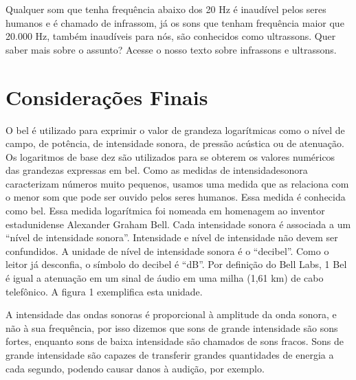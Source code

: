 \documentclass[
	article,		
	11pt,			
	oneside,		
	a4paper,			
	english,			
	brazil			
]{abntex2}
\begin{document}
Qualquer som que tenha frequência abaixo dos 20 Hz é inaudível pelos seres humanos e é chamado de infrassom, já os sons que tenham frequência maior que 20.000 Hz, também inaudíveis para nós, são conhecidos como ultrassons. Quer saber mais sobre o assunto? Acesse o nosso texto sobre infrassons e ultrassons.

\section{Considerações Finais}

O bel é utilizado para exprimir o valor de grandeza logarítmicas como o nível de campo, de potência, de intensidade sonora, de pressão acústica ou de atenuação. Os logaritmos de base dez são utilizados para se obterem os valores numéricos das grandezas expressas em bel. Como as medidas de intensidadesonora caracterizam números muito pequenos, usamos uma medida que as relaciona com o menor som que pode ser ouvido pelos seres humanos. Essa medida é conhecida como bel. Essa medida logarítmica foi nomeada em homenagem ao inventor estadunidense Alexander Graham Bell.
Cada intensidade sonora é associada a um “nível de intensidade sonora”. Intensidade e nível de intensidade não devem ser confundidos. A unidade de nível de intensidade sonora é o “decibel”. Como o leitor já desconfia, o símbolo do decibel é “dB”. Por definição do Bell Labs, 1 Bel é igual a atenuação em um sinal de áudio em uma milha (1,61 km) de cabo telefônico. A figura 1 exemplifica esta unidade.

A intensidade das ondas sonoras é proporcional à amplitude da onda sonora, e não à sua frequência, por isso dizemos que sons de grande intensidade são sons fortes, enquanto sons de baixa intensidade são chamados de sons fracos. Sons de grande intensidade são capazes de transferir grandes quantidades de energia a cada segundo, podendo causar danos à audição, por exemplo.



\end{document}
